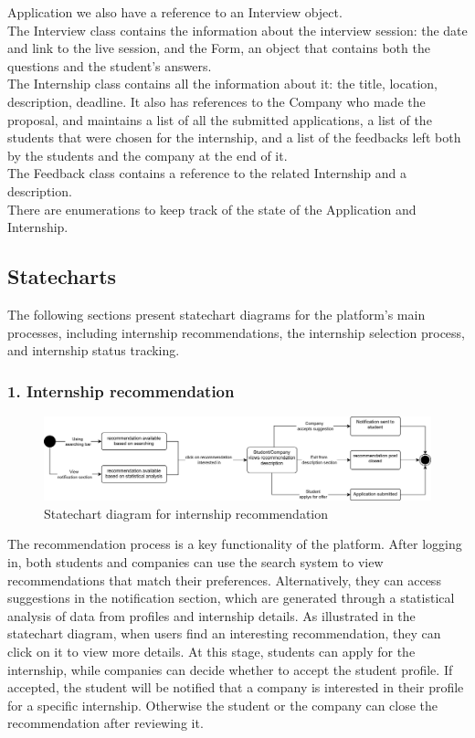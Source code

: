 Application we also have a reference to an Interview object. \\
The Interview class contains the information about the interview session: the date and link to the live session, and the Form, an object that contains both
the questions and the student's answers. \\
The Internship class contains all the information about it: the title, location, description, deadline. It also has references to the Company who made 
the proposal, and maintains a list of all the submitted applications, a list of the students that were chosen for the internship, and a list of
the feedbacks left both by the students and the company at the end of it. \\
The Feedback class contains a reference to the related Internship and a description.\\
There are enumerations to keep track of the state of the Application and Internship.

\subsection{Statecharts}\label{subsec:statecharts}
The following sections present statechart diagrams for the platform's main processes, including internship recommendations, the internship 
selection process, and internship status tracking. 

\subsubsection{1. Internship recommendation}\label{subsubsec:internship_application}
\begin{figure}[H]
    \centering
    \includegraphics[width=1\textwidth]{Images/Statecharts/Internship_recommendation.png}
    \caption{Statechart diagram for internship recommendation}\label{fig:statechart_internship_recommendation}
\end{figure}
The recommendation process is a key functionality of the platform. After logging in, both students and companies can use the search system to view 
recommendations that match their preferences. Alternatively, they can access suggestions in the notification section, which are generated through
a statistical analysis of data from profiles and internship details. As illustrated in the statechart diagram, when users find an interesting 
recommendation, they can click on it to view more details. At this stage, students can apply for the internship, while companies can decide whether
to accept the student profile. If accepted, the student will be notified that a company is interested in their profile for a specific internship. 
Otherwise the student or the company can close the recommendation after reviewing it.

